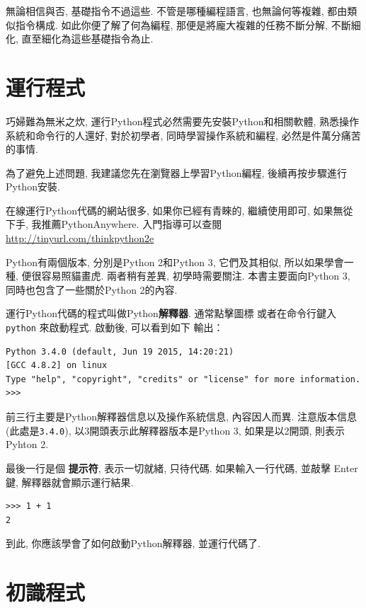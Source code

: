 \documentclass[10pt]{book}
\begin{document}
無論相信與否, 基礎指令不過這些. 
不管是哪種編程語言, 
也無論何等複雜, 都由類似指令構成. 
如此你便了解了何為編程, 
那便是將龐大複雜的任務不斷分解, 
不斷細化, 直至細化為這些基礎指令為止. 


\section{運行程式}

巧婦難為無米之炊, 運行Python程式必然需要先安裝Python和相關軟體, 
熟悉操作系統和命令行的人還好, 對於初學者, 同時學習操作系統和編程, 
必然是件萬分痛苦的事情. 

為了避免上述問題, 
我建議您先在瀏覽器上學習Python編程, 後續再按步驟進行Python安裝. 

在線運行Python代碼的網站很多, 
如果你已經有青睞的, 繼續使用即可,
如果無從下手, 我推薦PythonAnywhere. 
入門指導可以查閱\url{http://tinyurl.com/thinkpython2e}

Python有兩個版本, 分別是Python 2和Python 3, 它們及其相似, 
所以如果學會一種, 便很容易照貓畫虎. 兩者稍有差異, 初學時需要關注. 
本書主要面向Python 3, 同時也包含了一些關於Python 2的內容. 

運行Python代碼的程式叫做Python{\bf 解釋器}. 通常點擊圖標
或者在命令行鍵入{\tt python} 來啟動程式. 啟動後, 可以看到如下
輸出：

\begin{verbatim}
Python 3.4.0 (default, Jun 19 2015, 14:20:21) 
[GCC 4.8.2] on linux
Type "help", "copyright", "credits" or "license" for more information.
>>> 
\end{verbatim}
%

前三行主要是Python解釋器信息以及操作系統信息, 內容因人而異. 
注意版本信息(此處是{\tt 3.4.0}), 以3開頭表示此解釋器版本是Python 3, 
如果是以2開頭, 則表示Pyhton 2. 

最後一行是個 {\bf 提示符}, 表示一切就緒, 只待代碼. 
如果輸入一行代碼, 並敲擊 Enter鍵, 解釋器就會顯示運行結果. 

\begin{verbatim}
>>> 1 + 1
2
\end{verbatim}
%

到此, 你應該學會了如何啟動Python解釋器, 並運行代碼了. 

\section{初識程式}
\label{hello}
\end{document}
